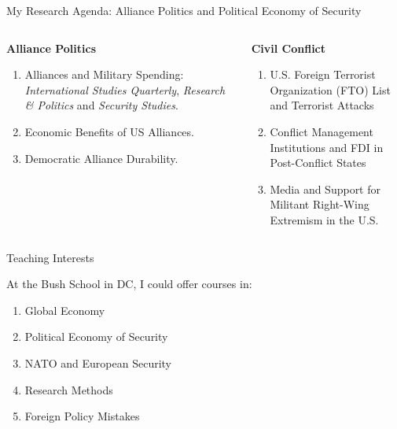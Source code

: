 \documentclass[12pt]{beamer}
\begin{document}
\begin{frame}{My Research Agenda: Alliance Politics and Political Economy of Security}

\begin{columns}

\begin{column}{0.5\textwidth}
\textbf{Alliance Politics}
\begin{enumerate} 
\item Alliances and Military Spending: \textit{International Studies Quarterly}, \textit{Research \& Politics} and  \textit{Security Studies}.
\item Economic Benefits of US Alliances. 
\item Democratic Alliance Durability.
\end{enumerate} 
\end{column}


\begin{column}{0.5\textwidth}
\textbf{Civil Conflict}
\begin{enumerate}
\item U.S. Foreign Terrorist Organization (FTO) List and Terrorist Attacks 
\item Conflict Management Institutions and FDI in Post-Conflict States
\item Media and Support for Militant Right-Wing Extremism in the U.S.
\end{enumerate} 
\end{column}


\end{columns}
 

\end{frame}



\begin{frame}{Teaching Interests}

At the Bush School in DC, I could offer courses in: 
\pause 
\begin{enumerate}
\item Global Economy
\pause
\item Political Economy of Security
\pause
\item NATO and European Security
\pause 
\item Research Methods
\pause
\item Foreign Policy Mistakes
\end{enumerate} 

\end{frame}
\end{document}

